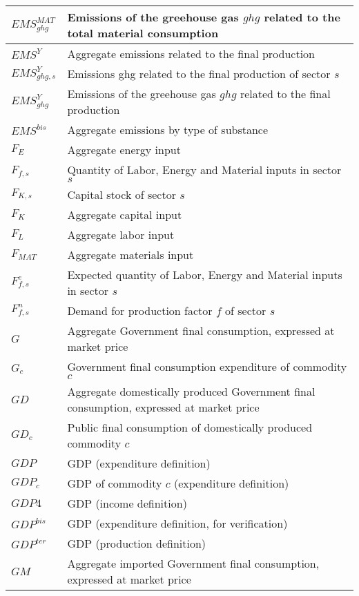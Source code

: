 \documentclass[12pt]{article}
\numberwithin{equation}{section}
\begin{document}
\begin{longtable}{@{}p{4cm}p{9cm}@{}}
 \midrule 
$EMS^{MAT}_{ghg}$ & Emissions of the greehouse gas $ghg$ related to the total material consumption \\
 \midrule 
$EMS^{Y}$ & Aggregate emissions related to the final production \\
 \midrule 
$EMS^{Y}_{ghg, s}$ & Emissions ghg related to the final production of sector $s$ \\
 \midrule 
$EMS^{Y}_{ghg}$ & Emissions of the greehouse gas $ghg$ related to the final production \\
 \midrule 
$EMS^{bis}$ & Aggregate emissions by type of substance \\
 \midrule 
$F_{E}$ & Aggregate energy input \\
 \midrule 
$F_{f, s}$ & Quantity of Labor, Energy and Material inputs in sector $s$ \\
 \midrule 
$F_{K, s}$ & Capital stock of sector $s$ \\
 \midrule 
$F_{K}$ & Aggregate capital input \\
 \midrule 
$F_{L}$ & Aggregate labor input \\
 \midrule 
$F_{MAT}$ & Aggregate materials input \\
 \midrule 
$F^{e}_{f, s}$ & Expected quantity of Labor, Energy and Material inputs in sector $s$ \\
 \midrule 
$F^{n}_{f, s}$ & Demand for production factor $f$ of sector $s$ \\
 \midrule 
$G$ & Aggregate Government final consumption, expressed at market price \\
 \midrule 
$G_{c}$ &  Government final consumption expenditure of commodity $c$ \\
 \midrule 
$GD$ & Aggregate domestically produced Government final consumption, expressed at market price \\
 \midrule 
$GD_{c}$ & Public final consumption of domestically produced commodity $c$ \\
 \midrule 
$GDP$ & GDP (expenditure definition) \\
 \midrule 
$GDP_{c}$ & GDP of commodity $c$ (expenditure definition) \\
 \midrule 
$GDP4$ &   GDP (income definition) \\
 \midrule 
$GDP^{bis}$ & GDP (expenditure definition, for verification) \\
 \midrule 
$GDP^{ter}$ &  GDP (production definition) \\
 \midrule 
$GM$ & Aggregate imported Government final consumption, expressed at market price \\

\end{longtable}
\end{document}

